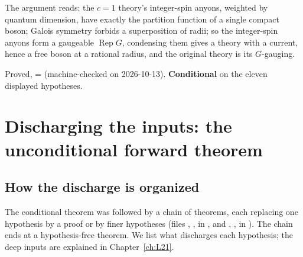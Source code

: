 \begin{physics}
The argument reads: the $c=1$ theory's integer-spin anyons, weighted by quantum dimension, have exactly the partition
function of a single compact boson; Galois symmetry forbids a superposition of radii; so the integer-spin anyons
form a gaugeable $\operatorname{Rep}G$, condensing them gives a theory with a current, hence a free boson at a
rational radius, and the original theory is its $G$-gauging.
\end{physics}

\begin{status}
Proved,  =  (machine-checked on 2026-10-13).
\textbf{Conditional} on the eleven displayed hypotheses.
\end{status}

\section{Discharging the inputs: the unconditional forward theorem}\label{l22:sec:discharge}

\subsection{How the discharge is organized}

The conditional theorem was followed by a chain of theorems, each replacing one hypothesis by a proof or by
finer hypotheses (files , ,  in
, and , ,
 in ). The chain ends at a hypothesis-free theorem. We list
what discharges each hypothesis; the deep inputs are explained in Chapter~\ref{ch:L21}.

